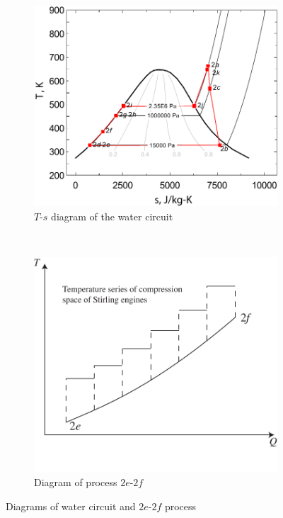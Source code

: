 \noindent \begin{figure}[htbp]
\centering
	\begin{subfigure}[b]{0.45\columnwidth}
	\includegraphics[width = \columnwidth]{fig/T-s_Water2}
	\caption{$T$-$s$ diagram of the water circuit}\label{fig:T-s_Water2}
	\end{subfigure}
	~
\begin{subfigure}[b]{0.45\columnwidth}
	\includegraphics[width = \columnwidth]{fig/HeatTransfer_Water-SEs}
	\caption{Diagram of process $2e$-$2f$}\label{fig:HeatTransfer_Water-SEs}
	\end{subfigure}
	
	\caption{Diagrams of water circuit and $2e$-$2f$ process}\label{fig:Diagrams$2e$-$2f$}
\end{figure}


